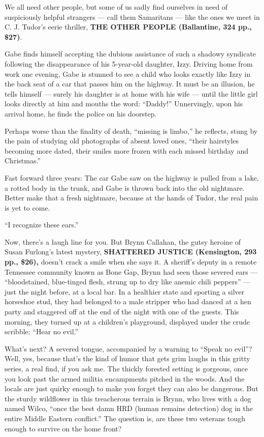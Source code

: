 We all need other people, but some of us sadly find ourselves in need of
suspiciously helpful strangers --- call them Samaritans --- like the
ones we meet in C. J. Tudor's eerie thriller, \textbf{THE OTHER PEOPLE
(Ballantine, 324 pp., \$27)}.

Gabe finds himself accepting the dubious assistance of such a shadowy
syndicate following the disappearance of his 5-year-old daughter, Izzy.
Driving home from work one evening, Gabe is stunned to see a child who
looks exactly like Izzy in the back seat of a car that passes him on the
highway. It must be an illusion, he tells himself --- surely his
daughter is at home with his wife --- until the little girl looks
directly at him and mouths the word: ``Daddy!'' Unnervingly, upon his
arrival home, he finds the police on his doorstep.

Perhaps worse than the finality of death, ``missing is limbo,'' he
reflects, stung by the pain of studying old photographs of absent loved
ones, ``their hairstyles becoming more dated, their smiles more frozen
with each missed birthday and Christmas.''

Fast forward three years: The car Gabe saw on the highway is pulled from
a lake, a rotted body in the trunk, and Gabe is thrown back into the old
nightmare. Better make that a fresh nightmare, because at the hands of
Tudor, the real pain is yet to come.

``I recognize these ears.''

Now, there's a laugh line for you. But Brynn Callahan, the gutsy heroine
of Susan Furlong's latest mystery, \textbf{SHATTERED JUSTICE
(Kensington, 293 pp., \$26),} doesn't crack a smile when she says it. A
sheriff's deputy in a remote Tennessee community known as Bone Gap,
Brynn had seen those severed ears --- ``bloodstained, blue-tinged flesh,
strung up to dry like anemic chili peppers'' --- just the night before,
at a local bar. In a healthier state and sporting a silver horseshoe
stud, they had belonged to a male stripper who had danced at a hen party
and staggered off at the end of the night with one of the guests. This
morning, they turned up at a children's playground, displayed under the
crude scribble: ``Hear no evil.''

What's next? A severed tongue, accompanied by a warning to ``Speak no
evil''? Well, yes, because that's the kind of humor that gets grim
laughs in this gritty series, a real find, if you ask me. The thickly
forested setting is gorgeous, once you look past the armed militia
encampments pitched in the woods. And the locals are just quirky enough
to make you forget they can also be dangerous. But the sturdy wildflower
in this treacherous terrain is Brynn, who lives with a dog named Wilco,
``once the best damn HRD (human remains detection) dog in the entire
Middle Eastern conflict.'' The question is, are these two veterans tough
enough to survive on the home front?

